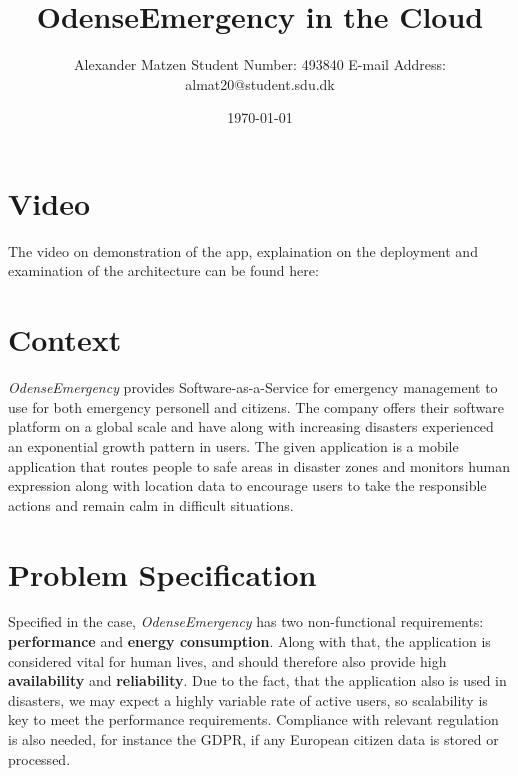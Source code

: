 \documentclass[11pt]{article}
\begin{document}
\setlength\parindent{0pt}
\setlength{\parskip}{.15em}
\pagestyle{empty}

\title{OdenseEmergency in the Cloud \newline}
\author{Alexander Matzen \addvspace{1em} Student Number: 493840 \newline E-mail Address: almat20@student.sdu.dk}
\date{\today}


\pagecolor{white}

\tableofcontents
\newpage

\section{Video}
The video on demonstration of the app, explaination on the deployment and examination of the architecture can be found here: 

\section{Context}

\textit{OdenseEmergency} provides Software-as-a-Service for emergency management to use for both emergency personell and citizens. The company offers their software platform on a global scale and have along with increasing disasters experienced an exponential growth pattern in users.
\newline\newline
The given application is a mobile application that routes people to safe areas in disaster zones and monitors human expression along with location data to encourage users to take the responsible actions and remain calm in difficult situations.

\section{Problem Specification}

Specified in the case, \textit{OdenseEmergency} has two non-functional requirements: \textbf{performance} and \textbf{energy consumption}. Along with that, the application is considered vital for human lives, and should therefore also provide high \textbf{availability} and \textbf{reliability}.
\newline\newline
Due to the fact, that the application also is used in disasters, we may expect a highly variable rate of active users, so scalability is key to meet the performance requirements.
\newline\newline
Compliance with relevant regulation is also needed, for instance the GDPR, if any European citizen data is stored or processed.
\end{document}
